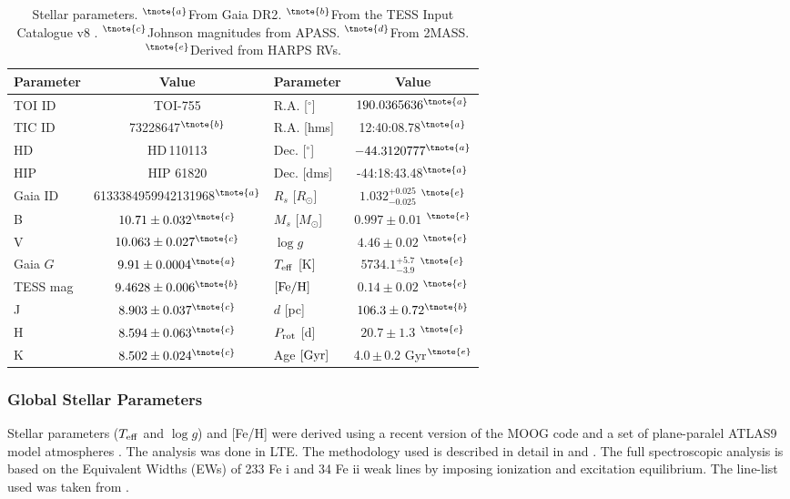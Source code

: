 \documentclass[fleqn,usenatbib]{mnras}
\newcommand{\harps}{{HARPS}}
\newcommand{\msun}{\mbox{$M_{\odot}$}}
\newcommand{\rsun}{\mbox{$R_{\odot}$}}
\newcommand{\teff}{$T_{\rm eff}$}
\newcommand{\feh}{\mbox{$\rm [Fe/H]$}}
\newcommand{\logg}{$\log g$}
\newcommand{\Tlogg}{ $ 4.46 \pm 0.02 $ }
\newcommand{\TFeH}{ $ 0.14 \pm 0.02 $ }
\newcommand{\TTeff}{ $ 5734.1^{+5.7}_{-3.9} $ }
\newcommand{\TMs}{ $ 0.997 \pm 0.01 $ }
\newcommand{\TRs}{ $ 1.032^{+0.025}_{-0.025} $ }
\newcommand{\Tperiod}{ $ 20.7 \pm 1.3 $ }
\newcommand{\TTstar}{TOI-755}
\newcommand{\Tstar}{HD\,110113}
\newcommand{\Tstarage}{4.0\,$\pm$\,0.2 Gyr}
\newcommand{\TGAIAid}{6133384959942131968}
\begin{document}
\begin{table}
    \centering
    \begin{tabular}{lc|lc}
        \hline
        \hline
        Parameter & Value & Parameter & Value \\
        \hline
        \hline
        TOI ID & \TTstar & R.A. [$^{\circ}$] & $190.0365636^{\tnote{a}}$ \\
        TIC ID & 73228647$^{\tnote{b}}$ & R.A. [hms] & 12:40:08.78$^{\tnote{a}}$ \\
        HD & \Tstar & Dec. [$^{\circ}$] & $-44.3120777^{\tnote{a}}$\\
        HIP & HIP 61820 & Dec. [dms] & -44:18:43.48$^{\tnote{a}}$ \\
        Gaia ID & \TGAIAid$^{\tnote{a}}$ & $R_s$ [\rsun{}] & \TRs{}$^{\tnote{e}}$ \\
        B & $10.71\pm0.032^{\tnote{c}}$ & $M_s$ [\msun{}] & \TMs{}$^{\tnote{e}}$ \\
        V & $10.063\pm0.027^{\tnote{c}}$ & \logg{} & \Tlogg{}$^{\tnote{e}}$ \\
        Gaia $G$ & $9.91\pm0.0004 ^{\tnote{a}}$ & \teff{} [K] & \TTeff{}$^{\tnote{e}}$ \\
        TESS mag & $9.4628\pm0.006^{\tnote{b}}$ & \feh{} & \TFeH{}$^{\tnote{e}}$ \\
        J & $8.903 \pm 0.037^{\tnote{c}}$ & $d$ [pc] & $106.3\pm0.72^{\tnote{b}}$\\
        H & $8.594 \pm 0.063^{\tnote{c}}$ & $P_{\rm rot}$ [d] & \Tperiod{}$^{\tnote{e}}$\\
        K & $8.502 \pm0.024^{\tnote{c}}$ & Age $[{\rm Gyr}]$ & \Tstarage{}$^{\tnote{e}}$ \\
        \hline
        \hline
    \end{tabular}
    \caption{Stellar parameters.
    $^{\tnote{a}}$From Gaia DR2\citep{brown2018gaia}. $^{\tnote{b}}$From the TESS Input Catalogue v8 \citep{stassun2019revised}. $^{\tnote{c}}$Johnson magnitudes from APASS\citep{apass}. $^{\tnote{d}}$From 2MASS\citep{skrutskie2006two}. $^{\tnote{e}}$Derived from \harps{} RVs.}
    \label{tab:starpars}
\end{table}

\subsubsection{Global Stellar Parameters}
Stellar parameters (\teff{} and \logg{}) and [Fe/H] were derived using
a recent version of the MOOG code \citep{1973ApJ...184..839S} and a set of plane-paralel
ATLAS9 model atmospheres  \citep{Kurucz-93}. The analysis was done in LTE. 
The methodology used is described in detail in \citet{2011A&A...533A.141S} and \citet{2013A&A...556A.150S}. The full spectroscopic analysis is 
based on the Equivalent Widths (EWs) of 233 Fe i and 34 Fe ii weak lines
by imposing ionization and excitation equilibrium. The line-list used
was taken from \citet{2008A&A...487..373S}.
\end{document}
